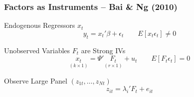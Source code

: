 
\begin{frame}[c]\frametitle{Factors as Instruments -- Bai \& Ng (2010)}
\begin{block}
   	{Endogenous Regressors $x_t$}
$$y_t = x_t' \beta + \epsilon_t \quad \quad E[x_t\epsilon_t] \neq 0 $$
\end{block}   

 \begin{block}
 	{Unobserved Variables $F_t$ are Strong IVs}
$$\underset{(k\times 1)}{x_t} = \Psi'\underset{(r\times 1)}{F_t} + u_t \quad \quad E[F_t \epsilon_t] = 0$$
 \end{block}

\begin{block}
	{Observe Large Panel $(z_{1t}, \hdots, z_{Nt})$}
		$$z_{it} = \lambda_i' F_t + e_{it}$$
\end{block}

\end{frame}


